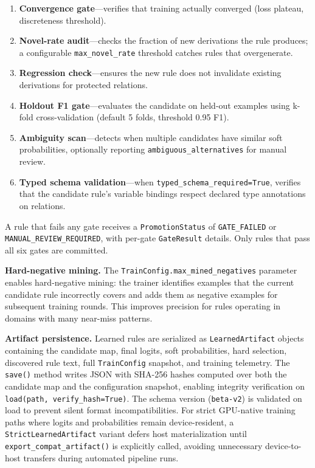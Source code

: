 \begin{enumerate}
  \item \textbf{Convergence gate}---verifies that training actually converged (loss plateau, discreteness threshold).
  \item \textbf{Novel-rate audit}---checks the fraction of new derivations the rule produces; a configurable \texttt{max\_novel\_rate} threshold catches rules that overgenerate.
  \item \textbf{Regression check}---ensures the new rule does not invalidate existing derivations for protected relations.
  \item \textbf{Holdout F1 gate}---evaluates the candidate on held-out examples using k-fold cross-validation (default 5 folds, threshold 0.95 F1).
  \item \textbf{Ambiguity scan}---detects when multiple candidates have similar soft probabilities, optionally reporting \texttt{ambiguous\_alternatives} for manual review.
  \item \textbf{Typed schema validation}---when \texttt{typed\_schema\_required=True}, verifies that the candidate rule's variable bindings respect declared type annotations on relations.
\end{enumerate}

A rule that fails any gate receives a \texttt{PromotionStatus} of \texttt{GATE\_FAILED} or \texttt{MANUAL\_REVIEW\_REQUIRED}, with per-gate \texttt{GateResult} details. Only rules that pass all six gates are committed.

\textbf{Hard-negative mining.} The \texttt{TrainConfig.max\_mined\_negatives} parameter enables hard-negative mining: the trainer identifies examples that the current candidate rule incorrectly covers and adds them as negative examples for subsequent training rounds. This improves precision for rules operating in domains with many near-miss patterns.

\textbf{Artifact persistence.} Learned rules are serialized as \texttt{LearnedArtifact} objects containing the candidate map, final logits, soft probabilities, hard selection, discovered rule text, full \texttt{TrainConfig} snapshot, and training telemetry. The \texttt{save()} method writes JSON with SHA-256 hashes computed over both the candidate map and the configuration snapshot, enabling integrity verification on \texttt{load(path, verify\_hash=True)}. The schema version (\texttt{beta-v2}) is validated on load to prevent silent format incompatibilities. For strict GPU-native training paths where logits and probabilities remain device-resident, a \texttt{StrictLearnedArtifact} variant defers host materialization until \texttt{export\_compat\_artifact()} is explicitly called, avoiding unnecessary device-to-host transfers during automated pipeline runs.
